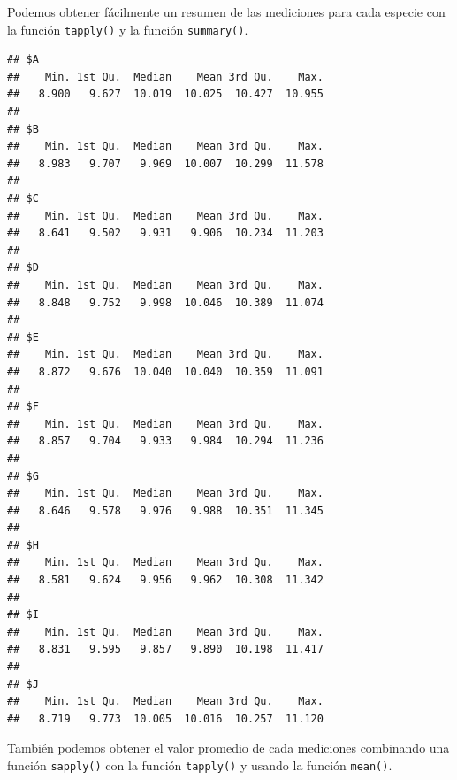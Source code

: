 \documentclass[
]{book}
\newenvironment{Shaded}{\begin{snugshade}}{\end{snugshade}}
\newcommand{\ControlFlowTok}[1]{\textcolor[rgb]{0.13,0.29,0.53}{\textbf{#1}}}
\newcommand{\DataTypeTok}[1]{\textcolor[rgb]{0.13,0.29,0.53}{#1}}
\newcommand{\DecValTok}[1]{\textcolor[rgb]{0.00,0.00,0.81}{#1}}
\newcommand{\KeywordTok}[1]{\textcolor[rgb]{0.13,0.29,0.53}{\textbf{#1}}}
\newcommand{\NormalTok}[1]{#1}
\newcommand{\OperatorTok}[1]{\textcolor[rgb]{0.81,0.36,0.00}{\textbf{#1}}}
\begin{document}
Podemos obtener fácilmente un resumen de las mediciones para cada especie con la función \texttt{tapply()} y la función \texttt{summary()}.

\begin{Shaded}
\end{Shaded}

\begin{verbatim}
## $A
##    Min. 1st Qu.  Median    Mean 3rd Qu.    Max. 
##   8.900   9.627  10.019  10.025  10.427  10.955 
## 
## $B
##    Min. 1st Qu.  Median    Mean 3rd Qu.    Max. 
##   8.983   9.707   9.969  10.007  10.299  11.578 
## 
## $C
##    Min. 1st Qu.  Median    Mean 3rd Qu.    Max. 
##   8.641   9.502   9.931   9.906  10.234  11.203 
## 
## $D
##    Min. 1st Qu.  Median    Mean 3rd Qu.    Max. 
##   8.848   9.752   9.998  10.046  10.389  11.074 
## 
## $E
##    Min. 1st Qu.  Median    Mean 3rd Qu.    Max. 
##   8.872   9.676  10.040  10.040  10.359  11.091 
## 
## $F
##    Min. 1st Qu.  Median    Mean 3rd Qu.    Max. 
##   8.857   9.704   9.933   9.984  10.294  11.236 
## 
## $G
##    Min. 1st Qu.  Median    Mean 3rd Qu.    Max. 
##   8.646   9.578   9.976   9.988  10.351  11.345 
## 
## $H
##    Min. 1st Qu.  Median    Mean 3rd Qu.    Max. 
##   8.581   9.624   9.956   9.962  10.308  11.342 
## 
## $I
##    Min. 1st Qu.  Median    Mean 3rd Qu.    Max. 
##   8.831   9.595   9.857   9.890  10.198  11.417 
## 
## $J
##    Min. 1st Qu.  Median    Mean 3rd Qu.    Max. 
##   8.719   9.773  10.005  10.016  10.257  11.120
\end{verbatim}

También podemos obtener el valor promedio de cada mediciones combinando una función \texttt{sapply()} con la función \texttt{tapply()} y usando la función \texttt{mean()}.

\begin{Shaded}
\end{Shaded}
\end{document}
